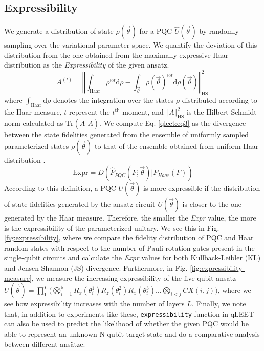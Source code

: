 \subsection{Expressibility}

We generate a distribution of state $\rho(\vec{\theta})$ for a PQC $\hat{U}(\vec{\theta})$ by randomly sampling over the variational parameter space. We quantify the deviation of this distribution from the one obtained from the maximally expressive Haar distribution as the \textit{Expressibility} of the given ansatz.
\begin{equation}\label{qleet:eq3}
    A^{(t)} =\left\Vert \int_\text{Haar}\rho^{\otimes t} \text{d}\rho - \int_{\vec{\theta}}\rho(\vec{\theta})^{\otimes t} \text{d}\rho(\vec{\theta}) \right\Vert_\text{HS}^2\,
\end{equation}
where $\int_\text{Haar}\text{d}\rho$ denotes the integration over the states $\rho$ distributed according to the Haar measure, $t$ represent the $t^{\text{th}}$ moment,  and $\left\Vert A \right\Vert_\text{HS}^2$ is the Hilbert-Schmidt norm calculated as $\text{Tr}(A^\dagger A)$. We compute Eq. \ref{qleet:eq3} as the divergence between the state fidelities generated from the ensemble of uniformly sampled parameterized states $\rho(\vec{\theta})$ to that of the ensemble obtained from uniform Haar distribution \cite{expressibility-entanglability-guzik}.
\begin{equation}
    \text{Expr} = D(\hat{P}_{PQC}(F; \vec{\theta}) | P_{Haar}(F))
\end{equation}
According to this definition, a PQC $U(\vec{\theta})$ is more expressible if the distribution of state fidelities generated by the ansatz circuit $U(\vec{\theta})$ is closer to the one generated by the Haar measure. Therefore, the smaller the \textit{Expr} value, the more is the expressibility of the parameterized unitary. We see this in  Fig. \ref{fig:expressibility}, where we compare the fidelity distribution of PQC and Haar random states with respect to the number of Pauli rotation gates present in the single-qubit circuits and calculate the \textit{Expr} values for both Kullback-Leibler (KL) and Jensen-Shannon (JS) divergence. Furthermore, in Fig. \ref{fig:expressibility-measure}, we measure the increasing expressibility of the five qubit ansatz $U(\vec{\theta}) =  \prod_{1}^{L}\big(\bigotimes_{i=1}^{5}R_x(\theta_i^1)R_z(\theta_i^2)R_x(\theta_i^3) \ldots \bigotimes_{i<j}CX(i, j)\big)$, where we see how expressibility increases with the number of layers $L$.  Finally, we note that, in addition to experiments like these, \texttt{expressibility} function in qLEET can also be used to predict the likelihood of whether the given PQC would be able to represent an unknown N-qubit target state and do a comparative analysis between different ansätze.

